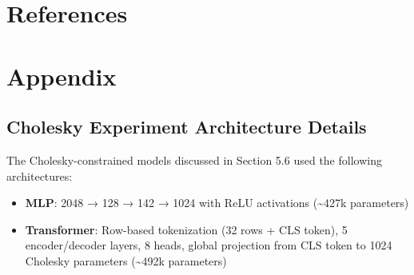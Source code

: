 \documentclass[11pt]{article}
\begin{document}
\section{References}
\label{sec:org3d18ad7}


\section{Appendix}
\label{sec:orgf87c8e9}
\subsection{Cholesky Experiment Architecture Details}
\label{sec:org2102b87}

The Cholesky-constrained models discussed in Section 5.6 used the following architectures:
\begin{itemize}
\item \textbf{MLP}: 2048 → 128 → 142 → 1024 with ReLU activations (\textasciitilde{}427k parameters)
\item \textbf{Transformer}: Row-based tokenization (32 rows + CLS token), 5 encoder/decoder layers, 8 heads, global projection from CLS token to 1024 Cholesky parameters (\textasciitilde{}492k parameters)
\end{itemize}
\end{document}
